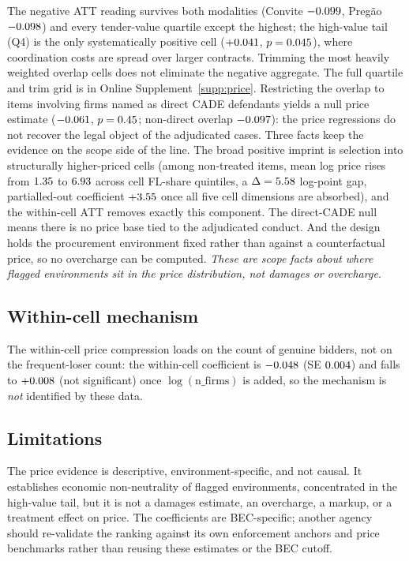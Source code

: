 The negative ATT reading survives both modalities (Convite
$-0.099$, Preg\~ao $-0.098$) and every
tender-value quartile except the highest; the high-value tail (Q4) is the
only systematically positive cell ($+0.041$, $p=0.045$),
where coordination costs are spread over larger contracts. Trimming the
most heavily weighted overlap cells does not eliminate the negative
aggregate. The full quartile and trim grid is in Online Supplement~\ref{supp:price}.
\label{app:scope_cade_submission}%
\label{app:scope_notdamages_submission}%
Restricting the overlap to items involving firms named as direct CADE
defendants yields a null price estimate ($-0.061$,
$p=0.45$; non-direct overlap $-0.097$):
the price regressions do not recover the legal object of the adjudicated
cases. Three facts keep the evidence on the scope side of the line. The
broad positive imprint is selection into structurally higher-priced cells
(among non-treated items, mean log price rises from $1.35$ to
$6.93$ across cell FL-share quintiles, a $\Delta=5.58$
log-point gap, partialled-out coefficient $+3.55$ once all
five cell dimensions are absorbed), and the within-cell ATT removes exactly
this component. The direct-CADE null means there is no price base tied to
the adjudicated conduct. And the design holds the procurement environment
fixed rather than against a counterfactual price, so no overcharge can be
computed. \emph{These are scope facts about where flagged environments sit
in the price distribution, not damages or overcharge.}

\subsection{Within-cell mechanism}
\label{app:scope_mechanism_submission}

The within-cell price compression loads on the count of genuine bidders,
not on the frequent-loser count: the within-cell coefficient is
$-0.048$ (SE $0.004$) and falls to
$+0.008$ (not significant) once
$\log(\text{n\_firms})$ is added, so the mechanism is \emph{not}
identified by these data.

\subsection{Limitations}
\label{app:scope_limits_submission}

The price evidence is descriptive, environment-specific, and not causal.
It establishes economic non-neutrality of flagged environments,
concentrated in the high-value tail, but it is not a damages estimate, an
overcharge, a markup, or a treatment effect on price. The coefficients
are BEC-specific; another agency should re-validate the ranking against
its own enforcement anchors and price benchmarks rather than reusing
these estimates or the BEC cutoff.
